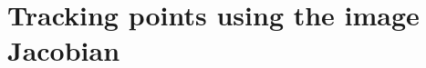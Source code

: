 

\chapter{Tracking points using the image Jacobian} %
\label{chap:tracking_points_using_the_image_jacobian}

\trackingSlowQRobotPlot

\trackingSlowCameraPose

\trackingErrorPlot

